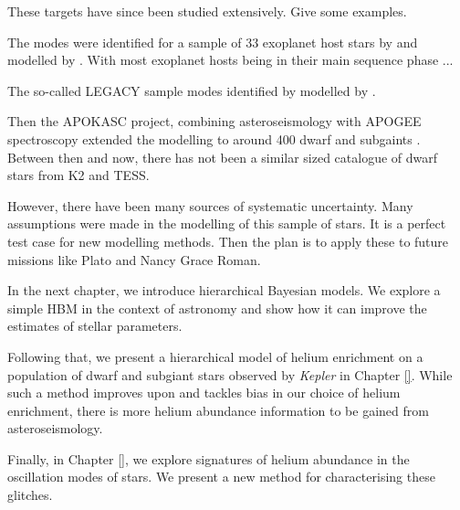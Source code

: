 These targets have since been studied extensively. Give some examples.

The modes were identified for a sample of 33 exoplanet host stars by \citet{Davies.Aguirre.ea2016} and modelled by \citet{SilvaAguirre.Davies.ea2015}. With most exoplanet hosts being in their main sequence phase \needcite...

The so-called LEGACY sample modes identified by \citet{Lund.SilvaAguirre.ea2017} modelled by \citet{SilvaAguirre.Lund.ea2017}.

Then the APOKASC project, combining asteroseismology with APOGEE spectroscopy extended the modelling to around 400 dwarf and subgaints \citep{Serenelli.Johnson.ea2017}. Between then and now, there has not been a similar sized catalogue of dwarf stars from K2 and TESS.

However, there have been many sources of systematic uncertainty. Many assumptions were made in the modelling of this sample of stars. It is a perfect test case for new modelling methods. Then the plan is to apply these to future missions like Plato and Nancy Grace Roman.

In the next chapter, we introduce hierarchical Bayesian models. We explore a simple HBM in the context of astronomy and show how it can improve the estimates of stellar parameters.

Following that, we present a hierarchical model of helium enrichment on a population of dwarf and subgiant stars observed by \emph{Kepler} in Chapter \ref{}. While such a method improves upon and tackles bias in our choice of helium enrichment, there is more helium abundance information to be gained from asteroseismology.

Finally, in Chapter \ref{}, we explore signatures of helium abundance in the oscillation modes of stars. We present a new method for characterising these glitches.
